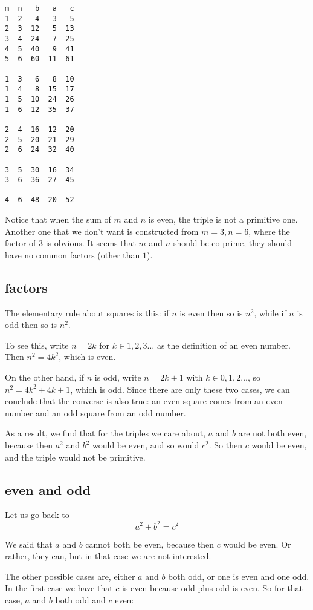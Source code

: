 \documentclass[11pt, oneside]{article}
\begin{document}
\begin{verbatim}
m  n   b   a   c
1  2   4   3   5
2  3  12   5  13
3  4  24   7  25
4  5  40   9  41
5  6  60  11  61

1  3   6   8  10
1  4   8  15  17
1  5  10  24  26
1  6  12  35  37

2  4  16  12  20
2  5  20  21  29
2  6  24  32  40

3  5  30  16  34
3  6  36  27  45

4  6  48  20  52
\end{verbatim}

Notice that when the sum of $m$ and $n$ is even, the triple is not a primitive one.  Another one that we don't want is constructed from $m = 3, n = 6$, where the factor of $3$ is obvious.  It seems that $m$ and $n$ should be co-prime, they should have no common factors (other than $1$).

\subsection*{factors}

The elementary rule about squares is this:  if $n$ is even then so is $n^2$, while if $n$ is odd then so is $n^2$.  

To see this, write $n = 2k$ for $k \in 1,2,3 \dots$ as the definition of an even number.  Then $n^2 = 4k^2$, which is even.  

On the other hand, if $n$ is odd, write $n = 2k + 1$ with $k \in 0, 1, 2 \dots$, so $n^2 = 4k^2 + 4k + 1$, which is odd.  Since there are only these two cases, we can conclude that the converse is also true:  an even square comes from an even number and an odd square from an odd number.

As a result, we find that for the triples we care about, $a$ and $b$ are not both even, because then $a^2$ and $b^2$ would be even, and so would $c^2$.  So then $c$ would be even, and the triple would not be primitive.

\subsection*{even and odd}

Let us go back to 
\[ a^2 + b^2 = c^2 \]

We said that $a$ and $b$ cannot both be even, because then $c$ would be even.  Or rather, they can, but in that case we are not interested.

The other possible cases are, either $a$ and $b$ both odd, or one is even and one odd.  In the first case we have that $c$ is even because odd plus odd is even.  So for that case, $a$ and $b$ both odd and $c$ even:
\end{document}
